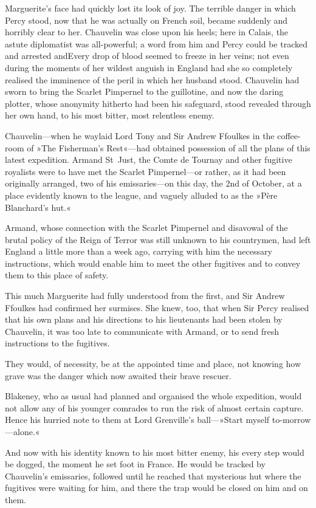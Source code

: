 Marguerite's face had quickly lost its look of joy. The terrible danger in which Percy stood, now that he was actually on French soil, became suddenly and horribly clear to her. Chauvelin was close upon his heels; here in Calais, the astute diplomatist was all-powerful; a word from him and Percy could be tracked and arrested and\textellipsis \allowbreak  Every drop of blood seemed to freeze in her veins; not even during the moments of her wildest anguish in England had she so completely realised the imminence of the peril in which her husband stood. Chauvelin had sworn to bring the Scarlet Pimpernel to the guillotine, and now the daring plotter, whose anonymity hitherto had been his safeguard, stood revealed through her own hand, to his most bitter, most relentless enemy.

Chauvelin—when he waylaid Lord Tony and Sir Andrew Ffoulkes in the coffee-room of »The Fisherman's Rest«—had obtained possession of all the plans of this latest expedition. Armand St~Just, the Comte de Tournay and other fugitive royalists were to have met the Scarlet Pimpernel—or rather, as it had been originally arranged, two of his emissaries—on this day, the 2nd of October, at a place evidently known to the league, and vaguely alluded to as the »Père Blanchard's hut.«

Armand, whose connection with the Scarlet Pimpernel and disavowal of the brutal policy of the Reign of Terror was still unknown to his countrymen, had left England a little more than a week ago, carrying with him the necessary instructions, which would enable him to meet the other fugitives and to convey them to this place of safety.

This much Marguerite had fully understood from the first, and Sir Andrew Ffoulkes had confirmed her surmises. She knew, too, that when Sir Percy realised that his own plans and his directions to his lieutenants had been stolen by Chauvelin, it was too late to communicate with Armand, or to send fresh instructions to the fugitives.

They would, of necessity, be at the appointed time and place, not knowing how grave was the danger which now awaited their brave rescuer.

Blakeney, who as usual had planned and organised the whole expedition, would not allow any of his younger comrades to run the risk of almost certain capture. Hence his hurried note to them at Lord Grenville's ball—»Start myself to-morrow—alone.«

And now with his identity known to his most bitter enemy, his every step would be dogged, the moment he set foot in France. He would be tracked by Chauvelin's emissaries, followed until he reached that mysterious hut where the fugitives were waiting for him, and there the trap would be closed on him and on them.

